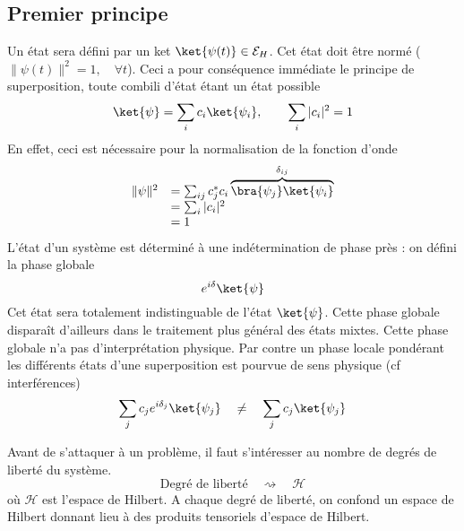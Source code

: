  \subsection{Premier principe}
 Un état sera défini par un ket $\ket{\psi(t)} \in \mathcal{E}_H$. Cet 
 état doit être normé ($\|\psi(t)\|^2 = 1, \quad \forall t$). Ceci a pour 
 conséquence immédiate le principe de superposition, toute combili d'état 
 étant un état possible
 \begin{equation}
 \ket{\psi} = \sum_i c_i \ket{\psi_i},\qquad \sum_i |c_i|^2 = 1
 \end{equation}
 En effet, ceci est nécessaire pour la normalisation de la fonction d'onde
 \begin{equation}
 \begin{array}{ll}
 \|\psi\|^2 &= \sum_{ij} c_j^*c_i\overbrace{\bra{\psi_j}\ket{\psi_i}}^{\delta_{ij}}\\
 &= \sum_i |c_i|^2 \\
 &= 1
 \end{array}
 \end{equation}
 L'état d'un système est déterminé à une indétermination de phase près : on 
 défini la phase globale
 \begin{equation}
 e^{i\delta}\ket{\psi}
 \end{equation}
 Cet état sera totalement indistinguable de l'état $\ket{\psi}$. Cette phase 
 globale disparaît d'ailleurs dans le traitement plus général des états mixtes. 
 Cette phase globale n'a pas d'interprétation physique. Par contre un phase 
 locale pondérant les différents états d'une superposition est pourvue de 
 sens physique (cf interférences)
 \begin{equation}
 \sum_j c_je^{i\delta_j}\ket{\psi_j}\quad\neq\quad \sum_j c_j\ket{\psi_j}
 \end{equation}
 
 Avant de s'attaquer à un problème, il faut s'intéresser au nombre de 
 degrés de liberté du système.
 \begin{equation}
 \text{Degré de liberté}\quad \rightsquigarrow\quad \mathcal{H}
 \end{equation}
 où $\mathcal{H}$ est l'espace de Hilbert. A chaque degré de liberté, on 
 confond un espace de Hilbert donnant lieu à des produits tensoriels d'espace 
 de Hilbert.
 
